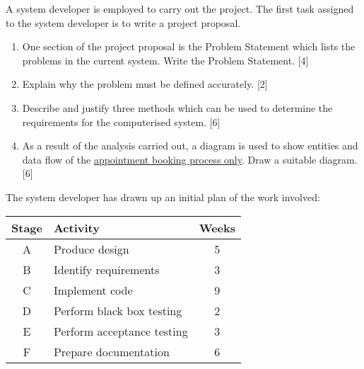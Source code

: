 A system developer is employed to carry out the project. The first
task assigned to the system developer is to write a project proposal.
\begin{enumerate}
\item One section of the project proposal is the Problem Statement which
lists the problems in the current system. Write the Problem Statement.
\hfill{}{[}4{]}
\item Explain why the problem must be defined accurately. \hfill{}{[}2{]}
\item Describe and justify three methods which can be used to determine
the requirements for the computerised system.\hfill{} {[}6{]}
\item As a result of the analysis carried out, a diagram is used to show
entities and data flow of the \uline{appointment booking process
only}. Draw a suitable diagram.\hfill{} {[}6{]}
\end{enumerate}
The system developer has drawn up an initial plan of the work involved: 
\noindent \begin{center}
\begin{tabular}{|c|l|c|}
\hline 
\textbf{Stage} & \textbf{Activity} & \textbf{Weeks}\tabularnewline
\hline 
A & Produce design & 5\tabularnewline
\hline 
B & Identify requirements & 3\tabularnewline
\hline 
C & Implement code & 9\tabularnewline
\hline 
D & Perform black box testing & 2\tabularnewline
\hline 
E & Perform acceptance testing & 3\tabularnewline
\hline 
F & Prepare documentation & 6\tabularnewline
\hline 
\end{tabular} 
\par\end{center}

